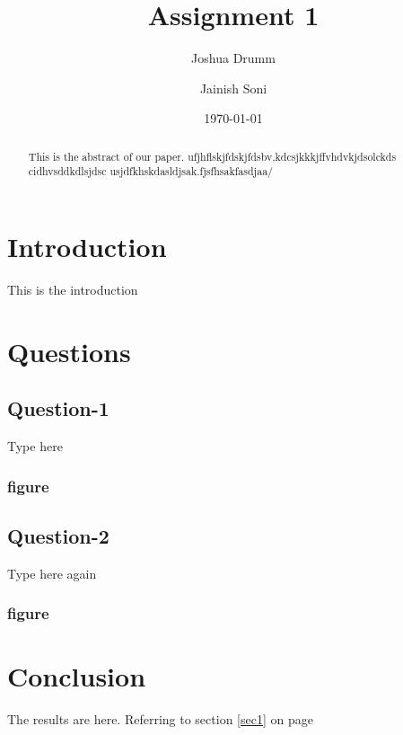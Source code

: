 \documentclass[sigplan,screen]{acmart}
\begin{document}
\title{Assignment 1}

\author{Joshua Drumm}

\author{Jainish Soni}

\date{\today}
\maketitle

\begin{abstract}
This is the abstract of our paper. ufjhflskjfdskjfdsbv,kdcsjkkkjffvhdvkjdsolckds cidhvsddkdlsjdsc
usjdfkhskdasldjsak.fjsfhsakfasdjaa/

\end{abstract}


\newpage
{}



\section{Introduction}
This is the introduction

\section{Questions}

\subsection{Question-1}
Type here

\subsubsection{figure}
	\begin{figure}[h]
	\end{figure}

\subsection{Question-2}
Type here again

\subsubsection{figure}
	\begin{figure}[h]
	\end{figure}

\section{Conclusion}
The results are here. Referring to section \ref{sec1} on page \pageref{sec1}

\newpage
\nocite{*} %


\end{document}
